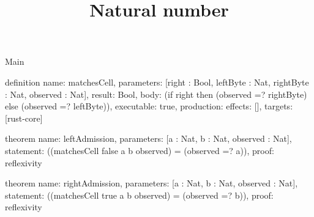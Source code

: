 \begin{lexlean}{Main}
\title{Natural number}
\begin{semanticmodule}
definition{
  name: matchesCell,
  parameters: [right : Bool, leftByte : Nat, rightByte : Nat, observed : Nat],
  result: Bool,
  body: (if right then (observed =? rightByte) else (observed =? leftByte)),
  executable: true,
  production: {effects: [], targets: [rust-core]}
}

theorem{
  name: leftAdmission,
  parameters: [a : Nat, b : Nat, observed : Nat],
  statement: ((matchesCell false a b observed) = (observed =? a)),
  proof: reflexivity{}
}

theorem{
  name: rightAdmission,
  parameters: [a : Nat, b : Nat, observed : Nat],
  statement: ((matchesCell true a b observed) = (observed =? b)),
  proof: reflexivity{}
}
\end{semanticmodule}
\end{lexlean}
